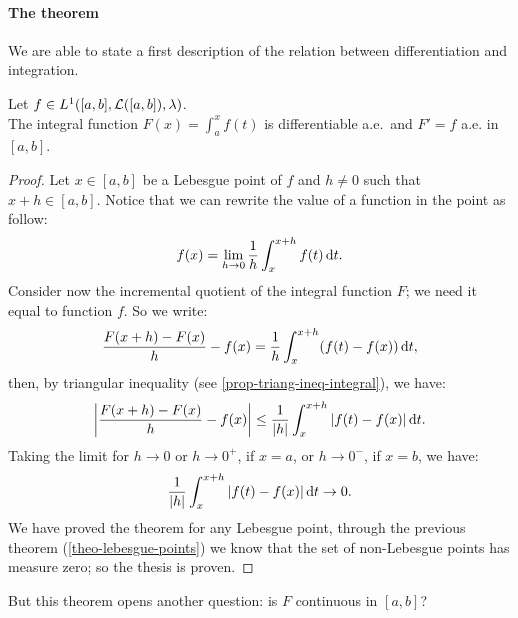 \paragraph{The theorem} We are able to state a first description of the relation between differentiation and integration.
\begin{theo}\label{theo-first-fundamental-calculus}
	Let $f\in L^1([a,b],\mathcal L([a,b]),\lambda)$.\\
	The integral function $F(x) = \int_a^x f(t)$ is differentiable a.e.\ and $F'=f$ a.e. in $[a, b]$.
\end{theo}
\begin{proof}
	Let $x\in[a,b]$ be a Lebesgue point of $f$ and $h \neq 0$ such that $x+h \in [a,b]$.
	Notice that we can rewrite the value of a function in the point as follow:
	$$
		f(x) 
		= \lim\limits_{h \to 0}
		\frac 1 h 
		\int_x^{x+h} f(t) \, \mathrm d t.$$
	Consider now the incremental quotient of the integral function $F$; we need it equal to function $f$. So we write:
	$$
		\frac{F(x+h)-F(x)}{h}-f(x) 
		= \frac 1 h \int_{x}^{x+h} (f(t)-f(x)) \,\mathrm d t
	,
	$$
	then, by triangular inequality (see \vref{prop-triang-ineq-integral}), we have:
	$$
		\left| \frac{F(x+h)-F(x)}{h}-f(x) \right| 
		\leq \frac{1}{|h|} \int_x^{x+h} |f(t)-f(x)| \,\mathrm d t
	.
	$$
	Taking the limit for $h \to 0$ or $h \to 0^+$, if $x=a$, or $h \to 0^-$, if $x=b$, we have: 
	$$
		 \frac{1}{|h|} \int_x^{x+h} |f(t)-f(x)| \,\mathrm d t
		 \to 0
	.
	$$
	We have proved the theorem for any Lebesgue point, through the previous theorem (\vref{theo-lebesgue-points}) we know that the set of non-Lebesgue points has measure zero; so the thesis is proven.
\end{proof}

But this theorem opens another question: is $F$ continuous in $[a,b]$?